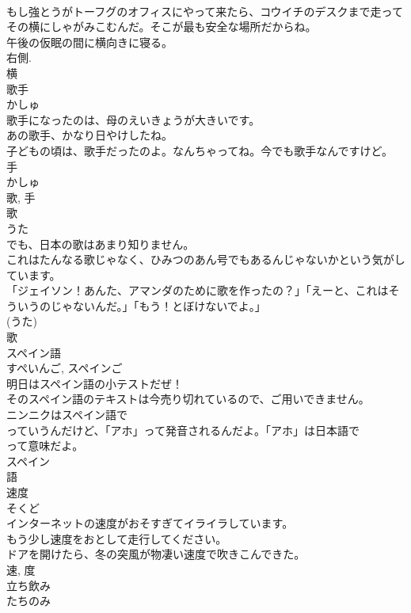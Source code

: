 \documentclass[8pt]{extreport}
\begin{document}
\begin{CJK}{UTF8}{min}
\\	もし強とうがトーフグのオフィスにやって来たら、コウイチのデスクまで走ってその横にしゃがみこむんだ。そこが最も安全な場所だからね。	
\\	午後の仮眠の間に横向きに寝る。	
\\	右側.
\\	横	
\\	歌手	
\\	かしゅ	
\\	歌手になったのは、母のえいきょうが大きいです。	
\\	あの歌手、かなり日やけしたね。	
\\	子どもの頃は、歌手だったのよ。なんちゃってね。今でも歌手なんですけど。	
\\	手 
\\	かしゅ 
\\	歌, 手	
\\	歌	
\\	うた	
\\	でも、日本の歌はあまり知りません。	
\\	これはたんなる歌じゃなく、ひみつのあん号でもあるんじゃないかという気がしています。	
\\	「ジェイソン！あんた、アマンダのために歌を作ったの？」「えーと、これはそういうのじゃないんだ。」「もう！とぼけないでよ。」	
\\	(うた) 
\\	歌	
\\	スペイン語	
\\	すぺいんご, スペインご	
\\	明日はスペイン語の小テストだぜ！	
\\	そのスペイン語のテキストは今売り切れているので、ご用いできません。	
\\	ニンニクはスペイン語で
\\	っていうんだけど、「アホ」って発音されるんだよ。「アホ」は日本語で
\\	って意味だよ。	
\\	スペイン 
\\	語	
\\	速度	
\\	そくど	
\\	インターネットの速度がおそすぎてイライラしています。	
\\	もう少し速度をおとして走行してください。	
\\	ドアを開けたら、冬の突風が物凄い速度で吹きこんできた。	
\\	速, 度	
\\	立ち飲み	
\\	たちのみ	

\end{CJK}
\end{document}
